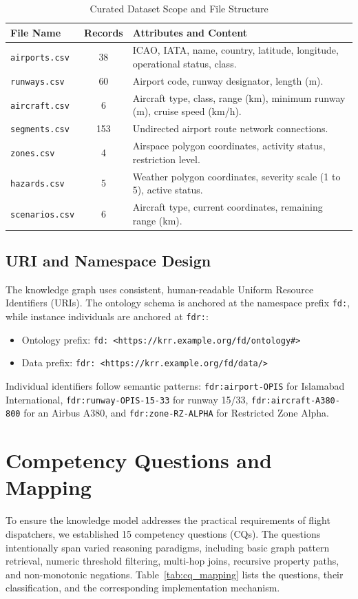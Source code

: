 \documentclass[conference]{IEEEtran}
\begin{document}
\begin{table}[htbp]
\caption{Curated Dataset Scope and File Structure}
\label{tab:dataset_summary}
\centering
\begin{tabular}{lcp{4.5cm}}
\toprule
\textbf{File Name} & \textbf{Records} & \textbf{Attributes and Content} \\
\midrule
\texttt{airports.csv} & 38 & ICAO, IATA, name, country, latitude, longitude, operational status, class. \\
\texttt{runways.csv} & 60 & Airport code, runway designator, length (m). \\
\texttt{aircraft.csv} & 6 & Aircraft type, class, range (km), minimum runway (m), cruise speed (km/h). \\
\texttt{segments.csv} & 153 & Undirected airport route network connections. \\
\texttt{zones.csv} & 4 & Airspace polygon coordinates, activity status, restriction level. \\
\texttt{hazards.csv} & 5 & Weather polygon coordinates, severity scale (1 to 5), active status. \\
\texttt{scenarios.csv} & 6 & Aircraft type, current coordinates, remaining range (km). \\
\bottomrule
\end{tabular}
\end{table}

\subsection{URI and Namespace Design}
The knowledge graph uses consistent, human-readable Uniform Resource Identifiers (URIs). The ontology schema is anchored at the namespace prefix \texttt{fd:}, while instance individuals are anchored at \texttt{fdr:}:
\begin{itemize}
    \item Ontology prefix: \texttt{fd: <https://krr.example.org/fd/ontology\#>}
    \item Data prefix: \texttt{fdr: <https://krr.example.org/fd/data/>}
\end{itemize}
Individual identifiers follow semantic patterns: \texttt{fdr:airport-OPIS} for Islamabad International, \texttt{fdr:runway-OPIS-15-33} for runway 15/33, \texttt{fdr:aircraft-A380-800} for an Airbus A380, and \texttt{fdr:zone-RZ-ALPHA} for Restricted Zone Alpha.

\section{Competency Questions and Mapping}
To ensure the knowledge model addresses the practical requirements of flight dispatchers, we established 15 competency questions (CQs). The questions intentionally span varied reasoning paradigms, including basic graph pattern retrieval, numeric threshold filtering, multi-hop joins, recursive property paths, and non-monotonic negations. Table~\ref{tab:cq_mapping} lists the questions, their classification, and the corresponding implementation mechanism.
\end{document}
